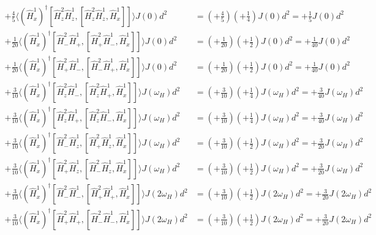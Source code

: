 \documentclass[notitlepage,11pt]{article}
\begin{document}
\begin{small}\begin{equation*}\begin{array}{rl}
      +\frac{4}{5}\langle (\hat{H}^1_x)^{\dagger} [\hat{H}^2_z\hat{H}^1_z,[\hat{H}^2_z\hat{H}^1_z,\hat{H}^1_x]] \rangle J\left(0\right)d^2 &= ( +\frac{4}{5})( +\frac{1}{4})J\left(0\right) d^2 =  +\frac{1}{5}J\left(0\right) d^2\\

 +\frac{1}{20}\langle (\hat{H}^1_x)^{\dagger} [\hat{H}^2_- \hat{H}^1_+ ,[\hat{H}^2_+ \hat{H}^1_- ,\hat{H}^1_x]] \rangle J\left(0\right)d^2 &= ( +\frac{1}{20})( +\frac{1}{2})J\left(0\right) d^2 =  +\frac{1}{40}J\left(0\right) d^2\\

 +\frac{1}{20}\langle (\hat{H}^1_x)^{\dagger} [\hat{H}^2_+ \hat{H}^1_- ,[\hat{H}^2_- \hat{H}^1_+ ,\hat{H}^1_x]] \rangle J\left(0\right)d^2 &= ( +\frac{1}{20})( +\frac{1}{2})J\left(0\right) d^2 =  +\frac{1}{40}J\left(0\right) d^2\\

 +\frac{3}{10}\langle (\hat{H}^1_x)^{\dagger} [\hat{H}^2_z\hat{H}^1_- ,[\hat{H}^2_z\hat{H}^1_+ ,\hat{H}^1_x]] \rangle J\left(\omega_H\right)d^2 &= ( +\frac{3}{10})( +\frac{1}{4})J\left(\omega_H\right) d^2 =  +\frac{3}{40}J\left(\omega_H\right) d^2\\

 +\frac{3}{10}\langle (\hat{H}^1_x)^{\dagger} [\hat{H}^2_z\hat{H}^1_+ ,[\hat{H}^2_z\hat{H}^1_- ,\hat{H}^1_x]] \rangle J\left(\omega_H\right)d^2 &= ( +\frac{3}{10})( +\frac{1}{4})J\left(\omega_H\right) d^2 =  +\frac{3}{40}J\left(\omega_H\right) d^2\\

 +\frac{3}{10}\langle (\hat{H}^1_x)^{\dagger} [\hat{H}^2_- \hat{H}^1_z,[\hat{H}^2_+ \hat{H}^1_z,\hat{H}^1_x]] \rangle J\left(\omega_H\right)d^2 &= ( +\frac{3}{10})( +\frac{1}{2})J\left(\omega_H\right) d^2 =  +\frac{3}{20}J\left(\omega_H\right) d^2\\

 +\frac{3}{10}\langle (\hat{H}^1_x)^{\dagger} [\hat{H}^2_+ \hat{H}^1_z,[\hat{H}^2_- \hat{H}^1_z,\hat{H}^1_x]] \rangle J\left(\omega_H\right)d^2 &= ( +\frac{3}{10})( +\frac{1}{2})J\left(\omega_H\right) d^2 =  +\frac{3}{20}J\left(\omega_H\right) d^2\\

 +\frac{3}{10}\langle (\hat{H}^1_x)^{\dagger} [\hat{H}^2_- \hat{H}^1_- ,[\hat{H}^2_+ \hat{H}^1_+ ,\hat{H}^1_x]] \rangle J\left(2\omega_H\right)d^2 &= ( +\frac{3}{10})( +\frac{1}{2})J\left(2\omega_H\right) d^2 =  +\frac{3}{20}J\left(2\omega_H\right) d^2\\

 +\frac{3}{10}\langle (\hat{H}^1_x)^{\dagger} [\hat{H}^2_+ \hat{H}^1_+ ,[\hat{H}^2_- \hat{H}^1_- ,\hat{H}^1_x]] \rangle J\left(2\omega_H\right)d^2 &= ( +\frac{3}{10})( +\frac{1}{2})J\left(2\omega_H\right) d^2 =  +\frac{3}{20}J\left(2\omega_H\right) d^2\\

\end{array}\end{equation*}\end{small}
\end{document}
